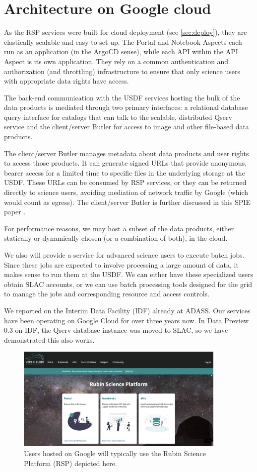 \section{Architecture on Google cloud} \label{sec:google}

As the RSP services were built for cloud deployment (see \autoref{sec:deploy}), they are elastically scalable and easy to set up.
The Portal and Notebook Aspects each run as an application (in the ArgoCD sense), while each API within the API Aspect is its own application.
They rely on a common authentication and authorization (and throttling) infrastructure to ensure that only science users with appropriate data rights have access.

The back-end communication with the USDF services hosting the bulk of the data products is mediated through two primary interfaces: a relational database query interface for catalogs that can talk to the scalable, distributed Qserv service and the client/server Butler for access to image and other file-based data products.

The client/server Butler manages metadata about data products and user rights to access those products.
It can generate signed URLs that provide anonymous, bearer access for a limited time to specific files in the underlying storage at the USDF.
These URLs can be consumed by RSP services, or they can be returned directly to science users, avoiding mediation of network traffic by Google (which would count as egress).
The client/server Butler is further discussed in this SPIE paper \cite{2024SPIE13101.129Jtmp}.

For performance reasons, we may host a subset of the data products, either statically or dynamically chosen (or a combination of both), in the cloud.

We also will provide a service for advanced science users to execute batch jobs.
Since these jobs are expected to involve processing a large amount of data, it makes sense to run them at the USDF.
We can either have these specialized users obtain SLAC accounts, or we can use batch processing tools designed for the grid to manage the jobs and corresponding resource and access controls.

We reported on the Interim Data Facility (IDF) already at ADASS\cite{2021arXiv211115030O}.
Our services have been operating on Google Cloud for over three years now.
In Data Preview 0.3 on IDF, the Qserv database instance was moved to SLAC, so we have demonstrated this also works.


\begin{figure}
\begin{centering}
\includegraphics[width=0.9\textwidth]{RSP.png}
	\caption{ Users hosted on Google will typically use the Rubin Science Platform (RSP) depicted here.  \label{fig:goglearch}}
\end{centering}
\end{figure}
